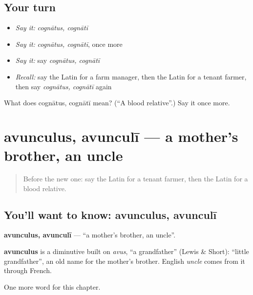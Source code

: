 \subsection*{Your turn}
\begin{itemize}
\raggedright
  \item \emph{Say it:} \emph{cognātus, cognātī}
  \item \emph{Say it:} \emph{cognātus, cognātī}, once more
  \item \emph{Say it:} say \emph{cognātus, cognātī}
  \item \emph{Recall:} say the Latin for a farm manager, then the Latin for a tenant farmer, then say \emph{cognātus, cognātī} again
\end{itemize}

\begin{tcolorbox}[breakable,colback=teal!4,colframe=teal!35!black,title={Before you move on}]
What does cognātus, cognātī mean? (\textquotedblleft{}A blood relative\textquotedblright{}.) Say it once more.
\end{tcolorbox}
\section[avunculus, avunculī]{avunculus, avunculī — a mother's brother, an uncle}

\label{lesson:LA-C189-avunculus}



\begin{quote}
Before the new one: say the Latin for a tenant farmer, then the Latin for a blood relative.
\end{quote}

\subsection*{You'll want to know: avunculus, avunculī}
\textbf{avunculus, avunculī} — \textquotedblleft{}a mother's brother, an uncle\textquotedblright{}.

\begin{cousinweb}
\textbf{avunculus} is a diminutive built on \emph{avus}, \textquotedblleft{}a grandfather\textquotedblright{} (Lewis \& Short): \textquotedblleft{}little grandfather\textquotedblright{}, an old name for the mother's brother. English \emph{uncle} comes from it through French.
\end{cousinweb}

\begin{grammarlens}[title={What you've built}]
One more word for this chapter.
\end{grammarlens}

